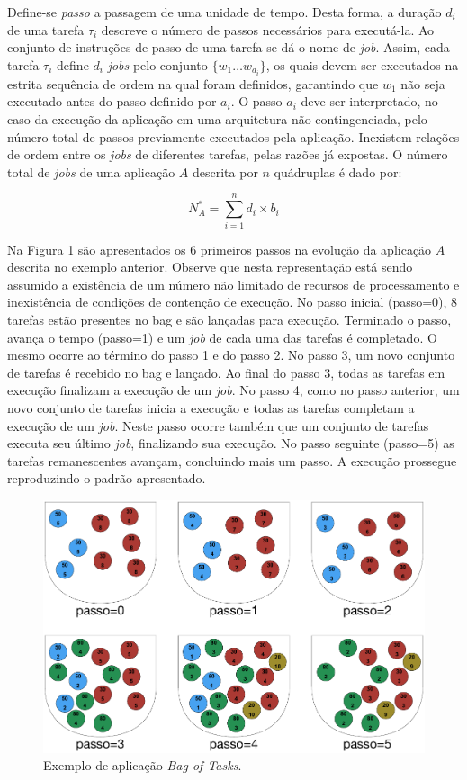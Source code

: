 \documentclass[tese,capa]{texufpel}
\begin{document}
Define-se \emph{passo} a passagem de uma unidade de tempo. Desta forma, a duração $d_i$ de uma tarefa $\tau_i$ descreve o número de passos necessários para executá-la. Ao conjunto de instruções de passo de uma tarefa se dá o nome de \emph{job}. Assim, cada tarefa $\tau_i$ define $d_i$ \textit{jobs} pelo conjunto $\{w_1 \dots w_{d_i}\}$, os quais devem ser executados na estrita sequência de ordem na qual foram definidos, garantindo que $w_1$ não seja executado antes do passo definido por $a_i$. O passo $a_i$ deve ser interpretado, no caso da execução da aplicação em uma arquitetura não contingenciada, pelo número total de passos previamente executados pela aplicação. Inexistem relações de ordem entre os \textit{jobs} de diferentes tarefas, pelas razões já expostas. O número total de \textit{jobs} de uma aplicação $A$ descrita por $n$ quádruplas é dado por:

\[
N^*_A = \sum_{i=1}^{n}d_i \times b_i
\]

Na Figura \ref{img:ExemploBoT} são apresentados os 6 primeiros passos na evolução da aplicação $A$ descrita no exemplo anterior. Observe que nesta representação está sendo assumido a existência de um número não limitado de recursos de processamento e inexistência de condições de contenção de execução. No passo inicial (passo=0), 8 tarefas estão presentes no bag e são lançadas para execução. Terminado o passo, avança o tempo (passo=1) e um \textit{job} de cada uma das tarefas é completado. O mesmo ocorre ao término do passo 1 e do passo 2. No passo 3, um novo conjunto de tarefas é recebido no bag e lançado. Ao final do passo 3, todas as tarefas em execução finalizam a execução de um \textit{job}. No passo 4, como no passo anterior, um novo conjunto de tarefas inicia a execução e todas as tarefas completam a execução de um \textit{job}. Neste passo ocorre também que um conjunto de tarefas executa seu último \textit{job}, finalizando sua execução. No passo seguinte (passo=5) as tarefas remanescentes avançam, concluindo mais um passo. A execução prossegue reproduzindo o padrão apresentado.

\begin{figure}[H]
	\centerline{
		\includegraphics[scale=0.9]{images/BagOfTasks4.pdf}}
	\caption[Exemplo de aplicação \textit{Bag of Tasks}]{Exemplo de aplicação \textit{Bag of Tasks}.}
	\label{img:ExemploBoT}
\end{figure}
\end{document}
